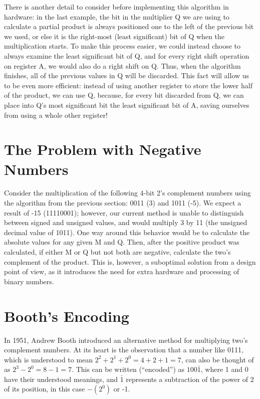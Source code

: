\documentclass{article}
\begin{document}
There is another detail to consider before implementing this algorithm in hardware: in the last example, the bit in the multiplier Q we are using to calculate a partial product is always positioned one to the left of the previous bit we used, or else it is the right-most (least significant) bit of Q when the multiplication starts.
To make this process easier, we could instead choose to always examine the least significant bit of Q, and for every right shift operation on register A, we would also do a right shift on Q.
Thus, when the algorithm finishes, all of the previous values in Q will be discarded.
This fact will allow us to be even more efficient: instead of using another register to store the lower half of the product, we can use Q, because, for every bit discarded from Q, we can place into Q's most significant bit the least significant bit of A, saving ourselves from using a whole other register!


\section{The Problem with Negative Numbers}
Consider the multiplication of the following 4-bit 2's complement numbers using the algorithm from the previous section: 0011 (3) and 1011 (-5).
We expect a result of -15 (11110001); however, our current method is unable to distinguish between signed and unsigned values, and would multiply 3 by 11 (the unsigned decimal value of 1011).
One way around this behavior would be to calculate the absolute values for any given M and Q.
Then, after the positive product was calculated, if either M or Q but not both are negative, calculate the two's complement of the product.
This is, however, a suboptimal solution from a design point of view, as it introduces the need for extra hardware and processing of binary numbers.

\section{Booth's Encoding}
In 1951, Andrew Booth introduced an alternative method for multiplying two's complement numbers.
At its heart is the observation that a number like 0111, which is understood to mean $2^2 + 2^1 + 2^0 = 4 + 2 + 1 = 7$, can also be thought of as $2^3 - 2^0 = 8 - 1 = 7$.
This can be written (``encoded'') as $100\bar{1}$, where 1 and 0 have their understood meanings, and $\bar{1}$ represents a subtraction of the power of 2 of its position, in this case $-(2^0)$ or -1.
\end{document}
